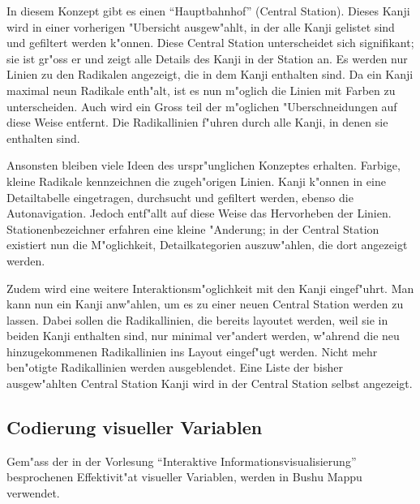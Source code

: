 In diesem Konzept gibt es einen "`Hauptbahnhof"' (Central Station). Dieses Kanji wird in einer vorherigen "Ubersicht ausgew"ahlt, in der alle Kanji gelistet sind und gefiltert werden k"onnen. Diese Central Station unterscheidet sich signifikant; sie ist gr"oss er und zeigt alle Details des Kanji in der Station an. Es werden nur Linien zu den Radikalen angezeigt, die in dem Kanji enthalten sind. Da ein Kanji maximal neun Radikale enth"alt, ist es nun m"oglich die Linien mit Farben zu unterscheiden. Auch wird ein Gross teil der m"oglichen "Uberschneidungen auf diese Weise entfernt. Die Radikallinien f"uhren durch alle Kanji, in denen sie enthalten sind.

Ansonsten bleiben viele Ideen des urspr"unglichen Konzeptes erhalten. Farbige, kleine Radikale kennzeichnen die zugeh"origen Linien. Kanji k"onnen in eine Detailtabelle eingetragen, durchsucht und gefiltert werden, ebenso die Autonavigation. Jedoch entf"allt auf diese Weise das Hervorheben der Linien. Stationenbezeichner erfahren eine kleine "Anderung; in der Central Station existiert nun die M"oglichkeit, Detailkategorien auszuw"ahlen, die dort angezeigt werden. 

Zudem wird eine weitere Interaktionsm"oglichkeit mit den Kanji eingef"uhrt. Man kann nun ein Kanji anw"ahlen, um es zu einer neuen Central Station werden zu lassen. Dabei sollen die Radikallinien, die bereits layoutet werden, weil sie in beiden Kanji enthalten sind, nur minimal ver"andert werden, w"ahrend die neu hinzugekommenen Radikallinien ins Layout eingef"ugt werden. Nicht mehr ben"otigte Radikallinien werden ausgeblendet. Eine Liste der bisher ausgew"ahlten Central Station Kanji wird in der Central Station selbst angezeigt.

\subsection{Codierung visueller Variablen}
Gem"ass  der in der Vorlesung "`Interaktive Informationsvisualisierung"' besprochenen Effektivit"at visueller Variablen, werden in Bushu Mappu verwendet. 

